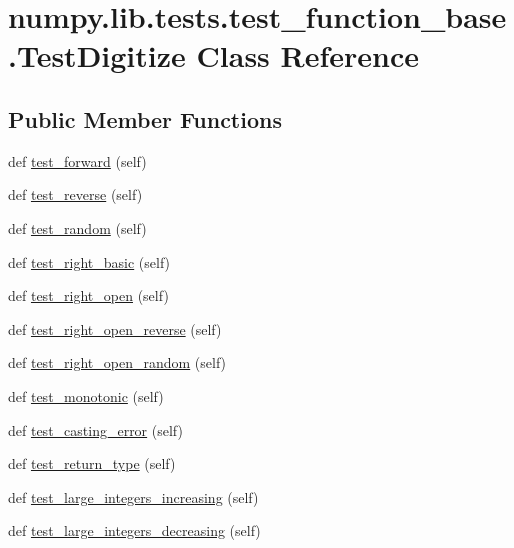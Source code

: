\hypertarget{classnumpy_1_1lib_1_1tests_1_1test__function__base_1_1TestDigitize}{}\section{numpy.\+lib.\+tests.\+test\+\_\+function\+\_\+base.\+Test\+Digitize Class Reference}
\label{classnumpy_1_1lib_1_1tests_1_1test__function__base_1_1TestDigitize}
\subsection*{Public Member Functions}
\begin{DoxyCompactItemize}
\item 
def \hyperlink{classnumpy_1_1lib_1_1tests_1_1test__function__base_1_1TestDigitize_a7e5fd51ff7391b5a791ae17becdecb26}{test\+\_\+forward} (self)
\item 
def \hyperlink{classnumpy_1_1lib_1_1tests_1_1test__function__base_1_1TestDigitize_a3f505ef40a1dd5703a66767e34d6c386}{test\+\_\+reverse} (self)
\item 
def \hyperlink{classnumpy_1_1lib_1_1tests_1_1test__function__base_1_1TestDigitize_a77447b06fd9251e087d6836dda51beae}{test\+\_\+random} (self)
\item 
def \hyperlink{classnumpy_1_1lib_1_1tests_1_1test__function__base_1_1TestDigitize_a69097f054ea6c35318700871de308350}{test\+\_\+right\+\_\+basic} (self)
\item 
def \hyperlink{classnumpy_1_1lib_1_1tests_1_1test__function__base_1_1TestDigitize_ac51aea02b14331670ed5eba46dba9329}{test\+\_\+right\+\_\+open} (self)
\item 
def \hyperlink{classnumpy_1_1lib_1_1tests_1_1test__function__base_1_1TestDigitize_a2bde27e7242ccbc2b8b20026ebaa2cce}{test\+\_\+right\+\_\+open\+\_\+reverse} (self)
\item 
def \hyperlink{classnumpy_1_1lib_1_1tests_1_1test__function__base_1_1TestDigitize_a8c82ce960808fb15bfd48842f06fb5e4}{test\+\_\+right\+\_\+open\+\_\+random} (self)
\item 
def \hyperlink{classnumpy_1_1lib_1_1tests_1_1test__function__base_1_1TestDigitize_ab98ff746b765d8d8bd52802382a23e51}{test\+\_\+monotonic} (self)
\item 
def \hyperlink{classnumpy_1_1lib_1_1tests_1_1test__function__base_1_1TestDigitize_a876c3c6314f888186fea7df994df790a}{test\+\_\+casting\+\_\+error} (self)
\item 
def \hyperlink{classnumpy_1_1lib_1_1tests_1_1test__function__base_1_1TestDigitize_ad1ad78f82cd153c431bf89da30b97bf1}{test\+\_\+return\+\_\+type} (self)
\item 
def \hyperlink{classnumpy_1_1lib_1_1tests_1_1test__function__base_1_1TestDigitize_a3f79cc69cfcc9a4d81ca8fc44de5071a}{test\+\_\+large\+\_\+integers\+\_\+increasing} (self)
\item 
def \hyperlink{classnumpy_1_1lib_1_1tests_1_1test__function__base_1_1TestDigitize_a7a05bd943caab405394884de3170f6dd}{test\+\_\+large\+\_\+integers\+\_\+decreasing} (self)
\end{DoxyCompactItemize}
